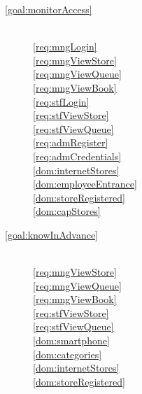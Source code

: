 \begin{description}
        \item[\ref{goal:monitorAccess}]  ~\\

        \ref{req:mngLogin}  ~\\
        \ref{req:mngViewStore}  ~\\
        \ref{req:mngViewQueue}  ~\\
        \ref{req:mngViewBook}  ~\\
        \ref{req:stfLogin}  ~\\
        \ref{req:stfViewStore}  ~\\
        \ref{req:stfViewQueue}  ~\\
        \ref{req:admRegister}  ~\\
        \ref{req:admCredentials}  ~\\

        \ref{dom:internetStores}  ~\\
        \ref{dom:employeeEntrance}  ~\\
        \ref{dom:storeRegistered}  ~\\
        \ref{dom:capStores}  ~\\


        \item[\ref{goal:knowInAdvance}]  ~\\
        \ref{req:mngViewStore}  ~\\
        \ref{req:mngViewQueue}  ~\\
        \ref{req:mngViewBook}  ~\\
        \ref{req:stfViewStore}  ~\\
        \ref{req:stfViewQueue}  ~\\

        \ref{dom:smartphone}  ~\\
        \ref{dom:categories}  ~\\
        \ref{dom:internetStores}  ~\\
        \ref{dom:storeRegistered}  ~\\



\end{description}
